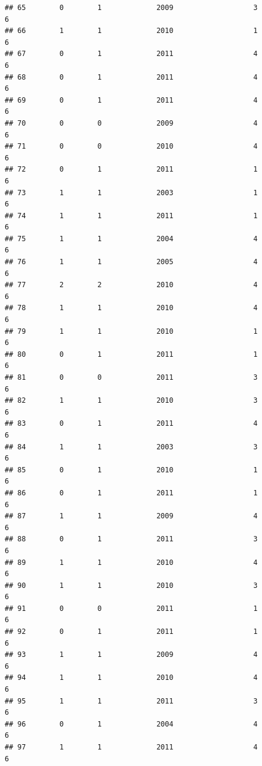 \documentclass[
]{article}
\begin{document}
\begin{verbatim}
## 65        0        1             2009                   3                 6
## 66        1        1             2010                   1                 6
## 67        0        1             2011                   4                 6
## 68        0        1             2011                   4                 6
## 69        0        1             2011                   4                 6
## 70        0        0             2009                   4                 6
## 71        0        0             2010                   4                 6
## 72        0        1             2011                   1                 6
## 73        1        1             2003                   1                 6
## 74        1        1             2011                   1                 6
## 75        1        1             2004                   4                 6
## 76        1        1             2005                   4                 6
## 77        2        2             2010                   4                 6
## 78        1        1             2010                   4                 6
## 79        1        1             2010                   1                 6
## 80        0        1             2011                   1                 6
## 81        0        0             2011                   3                 6
## 82        1        1             2010                   3                 6
## 83        0        1             2011                   4                 6
## 84        1        1             2003                   3                 6
## 85        0        1             2010                   1                 6
## 86        0        1             2011                   1                 6
## 87        1        1             2009                   4                 6
## 88        0        1             2011                   3                 6
## 89        1        1             2010                   4                 6
## 90        1        1             2010                   3                 6
## 91        0        0             2011                   1                 6
## 92        0        1             2011                   1                 6
## 93        1        1             2009                   4                 6
## 94        1        1             2010                   4                 6
## 95        1        1             2011                   3                 6
## 96        0        1             2004                   4                 6
## 97        1        1             2011                   4                 6

\end{verbatim}
\end{document}
